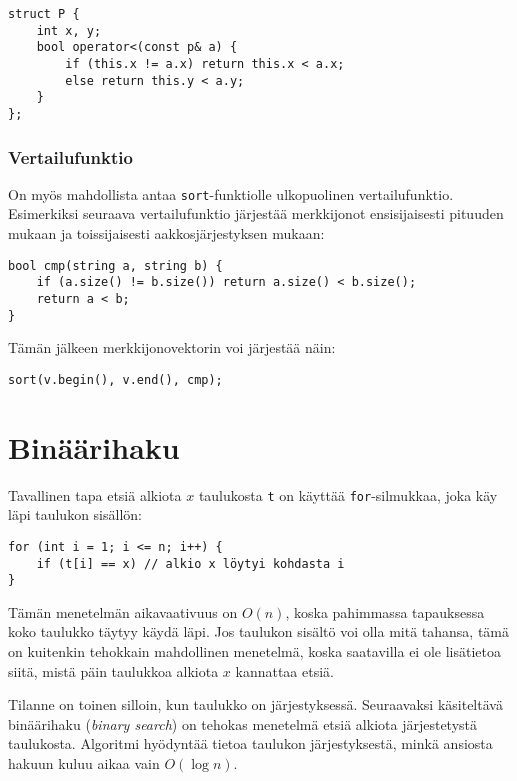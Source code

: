 \begin{lstlisting}
struct P {
    int x, y;
    bool operator<(const p& a) {
        if (this.x != a.x) return this.x < a.x;
        else return this.y < a.y;
    }
};
\end{lstlisting}

\subsubsection{Vertailufunktio}

On myös mahdollista antaa
\texttt{sort}-funktiolle ulkopuolinen vertailufunktio.
Esimerkiksi seuraava vertailufunktio
järjestää merkkijonot ensisijaisesti pituuden mukaan
ja toissijaisesti aakkosjärjestyksen mukaan:

\begin{lstlisting}
bool cmp(string a, string b) {
    if (a.size() != b.size()) return a.size() < b.size();
    return a < b;
}
\end{lstlisting}

Tämän jälkeen merkkijonovektorin voi järjestää näin:

\begin{lstlisting}
sort(v.begin(), v.end(), cmp);
\end{lstlisting}

\section{Binäärihaku}


Tavallinen tapa etsiä alkiota $x$ taulukosta \texttt{t}
on käyttää \texttt{for}-silmukkaa, joka käy läpi
taulukon sisällön:

\begin{lstlisting}
for (int i = 1; i <= n; i++) {
    if (t[i] == x) // alkio x löytyi kohdasta i
}
\end{lstlisting}

Tämän menetelmän aikavaativuus on $O(n)$,
koska pahimmassa tapauksessa koko taulukko täytyy
käydä läpi.
Jos taulukon sisältö voi olla mitä tahansa,
tämä on kuitenkin tehokkain mahdollinen menetelmä,
koska saatavilla ei ole lisätietoa siitä,
mistä päin taulukkoa alkiota $x$ kannattaa etsiä.

Tilanne on toinen silloin, kun taulukko on
järjestyksessä.
Seuraavaksi käsiteltävä binäärihaku
(\textit{binary search}) on tehokas menetelmä
etsiä alkiota järjestetystä taulukosta.
Algoritmi hyödyntää tietoa taulukon
järjestyksestä,
minkä ansiosta hakuun kuluu aikaa vain $O(\log n)$.

